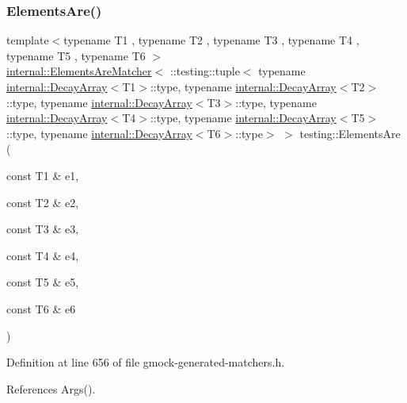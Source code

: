 \subsubsection{\texorpdfstring{Elements\+Are()}{ElementsAre()}\hspace{0.1cm}{\footnotesize\ttfamily [7/11]}}
{\footnotesize\ttfamily template$<$typename T1 , typename T2 , typename T3 , typename T4 , typename T5 , typename T6 $>$ \\
\hyperlink{classtesting_1_1internal_1_1ElementsAreMatcher}{internal\+::\+Elements\+Are\+Matcher}$<$ \+::testing\+::tuple$<$ typename \hyperlink{structtesting_1_1internal_1_1DecayArray}{internal\+::\+Decay\+Array}$<$T1$>$\+::type, typename \hyperlink{structtesting_1_1internal_1_1DecayArray}{internal\+::\+Decay\+Array}$<$T2$>$\+::type, typename \hyperlink{structtesting_1_1internal_1_1DecayArray}{internal\+::\+Decay\+Array}$<$T3$>$\+::type, typename \hyperlink{structtesting_1_1internal_1_1DecayArray}{internal\+::\+Decay\+Array}$<$T4$>$\+::type, typename \hyperlink{structtesting_1_1internal_1_1DecayArray}{internal\+::\+Decay\+Array}$<$T5$>$\+::type, typename \hyperlink{structtesting_1_1internal_1_1DecayArray}{internal\+::\+Decay\+Array}$<$T6$>$\+::type$>$ $>$ testing\+::\+Elements\+Are (\begin{DoxyParamCaption}\item[{const T1 \&}]{e1,  }\item[{const T2 \&}]{e2,  }\item[{const T3 \&}]{e3,  }\item[{const T4 \&}]{e4,  }\item[{const T5 \&}]{e5,  }\item[{const T6 \&}]{e6 }\end{DoxyParamCaption})\hspace{0.3cm}{\ttfamily [inline]}}



Definition at line 656 of file gmock-\/generated-\/matchers.\+h.



References Args().



